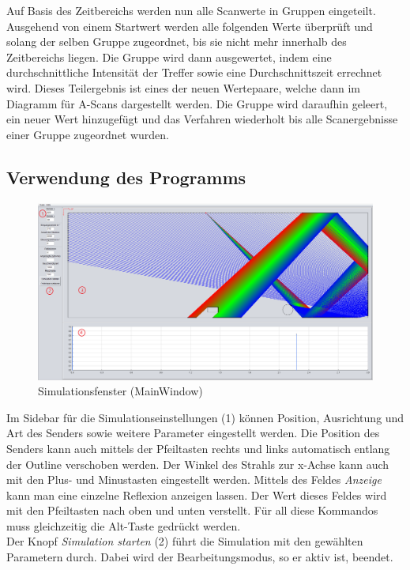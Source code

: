 \documentclass[reducespace,stylepage,semiarbeit]{spezidoc}
\begin{document}
Auf Basis des Zeitbereichs werden nun alle Scanwerte in Gruppen eingeteilt. 
Ausgehend von einem Startwert werden alle folgenden Werte überprüft und solang der selben Gruppe zugeordnet, bis sie nicht mehr innerhalb des Zeitbereichs liegen. 
Die Gruppe wird dann ausgewertet, indem eine durchschnittliche Intensität der Treffer sowie eine Durchschnittszeit errechnet wird. 
Dieses Teilergebnis ist eines der neuen Wertepaare, welche dann im Diagramm für A-Scans dargestellt werden. 
Die Gruppe wird daraufhin geleert, ein neuer Wert hinzugefügt und das Verfahren wiederholt bis alle Scanergebnisse einer Gruppe zugeordnet wurden.


\subsection{Verwendung des Programms} %
\begin{figure}[h]
\centering
\includegraphics[scale=0.315]{pictures/MainWindow.png}
\caption{Simulationsfenster (MainWindow)}
\end{figure}
Im Sidebar für die Simulationseinstellungen (1) können Position, Ausrichtung und Art des Senders sowie weitere Parameter eingestellt werden. 
Die Position des Senders kann auch mittels der Pfeiltasten rechts und links automatisch entlang der Outline verschoben werden. 
Der Winkel des Strahls zur x-Achse kann auch mit den Plus- und Minustasten eingestellt werden. 
Mittels des Feldes \textit{Anzeige} kann man eine einzelne Reflexion anzeigen lassen. 
Der Wert dieses Feldes wird mit den Pfeiltasten nach oben und unten verstellt. 
Für all diese Kommandos muss gleichzeitig die Alt-Taste gedrückt werden.\\
Der Knopf \textit{Simulation starten} (2) führt die Simulation mit den gewählten Parametern durch. 
Dabei wird der Bearbeitungsmodus, so er aktiv ist, beendet.\\
\end{document}
